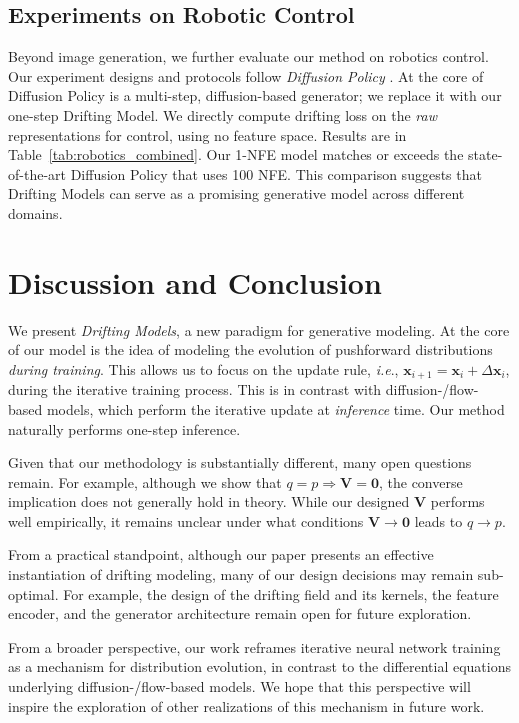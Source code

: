 \documentclass{article}
\newcommand{\vv}[1]{\mathbf{#1}}
\newcommand{\x}{\vv{x}}
\newcommand{\V}{\vv{V}}
\def\onedot{.}
\def\ie{\emph{i.e}\onedot} \def\Ie{\emph{I.e}\onedot}
\theoremstyle{plain}
\theoremstyle{definition}
\theoremstyle{remark}
\begin{document}
\subsection{Experiments on Robotic Control}

Beyond image generation, we further evaluate our method on robotics control. Our experiment designs and protocols follow \textit{Diffusion Policy} \citep{chi2025diffusion}. At the core of Diffusion Policy is a multi-step, diffusion-based generator; we replace it with our one-step Drifting Model.
We directly compute drifting loss on the \textit{raw} representations for control, using no feature space. Results are in Table~\ref{tab:robotics_combined}.
Our 1-NFE model matches or exceeds the state-of-the-art Diffusion Policy that uses 100 NFE.
This comparison suggests that Drifting Models can serve as a promising generative model across different domains.



\section{Discussion and Conclusion}

We present \emph{Drifting Models}, a new paradigm for generative modeling.
At the core of our model is the idea of modeling the evolution of pushforward distributions \textit{during training}.
This allows us to focus on the update rule, \ie, $\x_{i+1} = \x_{i} + \Delta \x_i$, during the iterative training process.
This is in contrast with diffusion-/flow-based models, which perform the iterative update at \textit{inference} time. Our method naturally performs one-step inference.

Given that our methodology is substantially different, many open questions remain.
For example, although we show that $q=p \Rightarrow \V=\mathbf{0}$, the converse implication does not generally hold in theory.
While our designed $\V$ performs well empirically, it remains unclear under what conditions $\V\rightarrow\mathbf{0}$ leads to $q\rightarrow p$.

From a practical standpoint, although our paper presents an effective instantiation of drifting modeling, many of our design decisions may remain sub-optimal. For example, the design of the drifting field and its kernels, the feature encoder, and the generator architecture remain open for future exploration.

From a broader perspective, our work reframes iterative neural network training as a mechanism for distribution evolution, in contrast to the differential equations underlying diffusion-/flow-based models.
We hope that this perspective will inspire the exploration of other realizations of this mechanism in future work.
\end{document}
